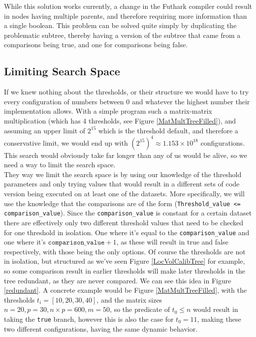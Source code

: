 While this solution works currently, a change in the Futhark compiler could
result in nodes having multiple parents, and therefore requiring more
information than a single boolean. This problem can be solved quite simply by
duplicating the problematic subtree, thereby having a version of the subtree that came from a
comparisons being true, and one for comparisons being false.

\subsection{Limiting Search Space}
If we knew nothing about
the thresholds, or their structure we would have to try every configuration of
numbers between 0 and whatever the highest number their implementation allows. 
With a simple program such a matrix-matrix multiplication (which has 4 thresholds, see Figure \ref{MatMultTreeFilled}), and assuming an upper limit of $2^{15}$ which is the threshold default, and therefore a conservative limit,
we would end up with $\left(2^{15}\right)^4 \approx 1.153\times10^{18}$ configurations.
This search would obviously take far longer than any of us would be alive, so we need a way to limit the search space.
\\
They way we limit the search space is by using our knowledge of the threshold
parameters and only trying values that would result in a different sets of code 
version being executed on at least one of the datasets. More specifically, we will
use the knowledge that the comparisons are of the form
(\texttt{Threshold\_value <= comparison\_value}). Since the
\texttt{comparison\_value} is constant for a certain dataset there are effectively
only two different threshold values that need to be checked for one threshold 
in isolation. One where it's equal to the \texttt{comparison\_value} and one
where it's $\texttt{comparison\_value} + 1$, as these will result in true and
false respectively, with those being the only options.
Of course the thresholds are not in isolation, but structured as we've seen
Figure \ref{LocVolCalibTree} for example, so some comparison result in earlier 
thresholds will make later thresholds in the tree redundant, as they are never compared. We can see this idea in Figure \ref{redundant}. A concrete example would be Figure \ref{MatMultTreeFilled}, with the thresholds $t_i = [10, 20, 30, 40]$, and the matrix sizes $n=20, p=30, n\times p=600, m=50$, so the predicate of $t_0 \leq n$ would result in taking the \texttt{true} branch, however this is also the case for $t_0 = 11$, making these two different configurations, having the same dynamic behavior.
